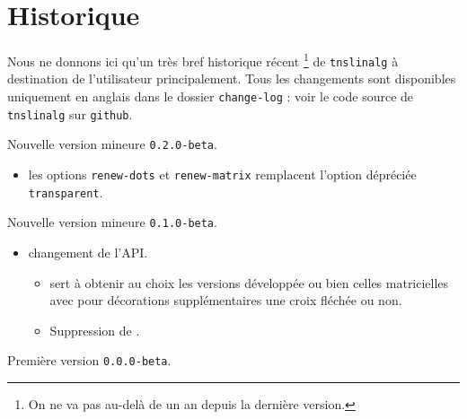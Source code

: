 \documentclass[12pt,a4paper]{article}
\begin{document}
\newpage

\section{Historique}

Nous ne donnons ici qu'un très bref historique récent
\footnote{
	On ne va pas au-delà de un an depuis la dernière version.
}
de \verb+tnslinalg+ à destination de l'utilisateur principalement.
Tous les changements sont disponibles uniquement en anglais dans le dossier \verb+change-log+ : voir le code source de \verb+tnslinalg+ sur \verb+github+.

\begin{description}

    \medskip
    \item[2021-02-26] Nouvelle version mineure \verb+0.2.0-beta+.
    
    \begin{itemize}[itemsep=.5em]
        \item {}
              les options \verb#renew-dots# et \verb#renew-matrix# remplacent l'option dépréciée \verb#transparent#.
    
    
    \end{itemize}
    
    \separation
    


    \medskip
    \item[2020-08-27] Nouvelle version mineure \verb+0.1.0-beta+.
    
    \begin{itemize}[itemsep=.5em]
        \item {} changement de l'API.
        \begin{itemize}[itemsep=.5em]
            \item {} sert à obtenir au choix les versions développée ou bien celles matricielles avec pour décorations supplémentaires une croix fléchée ou non.
    
            \item Suppression de .
        \end{itemize}
    
    
    \end{itemize}
    
    \separation
    


    \medskip
    \item[2020-07-10] Première version \verb+0.0.0-beta+.

\end{description}
\end{document}
